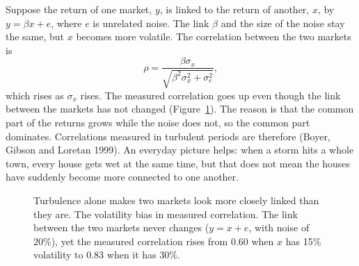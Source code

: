 Suppose the return of one market, $y$, is linked to the return of another, $x$, by $y = \beta x + e$, where $e$ is unrelated noise. The link $\beta$ and the size of the noise stay the same, but $x$ becomes more volatile. The correlation between the two markets is
\begin{equation}
  \rho = \frac{\beta\sigma_x}{\sqrt{\beta^2\sigma_x^2 + \sigma_e^2}},
  \label{eq:13-bias}
\end{equation}
which rises as $\sigma_x$ rises. The measured correlation goes up even though the link between the markets has not changed (Figure~\ref{fig:13-bias}). The reason is that the common part of the returns grows while the noise does not, so the common part dominates. Correlations measured in turbulent periods are therefore  (Boyer, Gibson and Loretan 1999). An everyday picture helps: when a storm hits a whole town, every house gets wet at the same time, but that does not mean the houses have suddenly become more connected to one another.

\begin{figure}[htbp]
\centering
{}
\caption{Turbulence alone makes two markets look more closely linked than they are. The volatility bias in measured correlation. The link between the two markets never changes ($y = x + e$, with noise of 20\%), yet the measured correlation rises from 0.60 when $x$ has 15\% volatility to 0.83 when it has 30\%.}
\label{fig:13-bias}
\end{figure}

